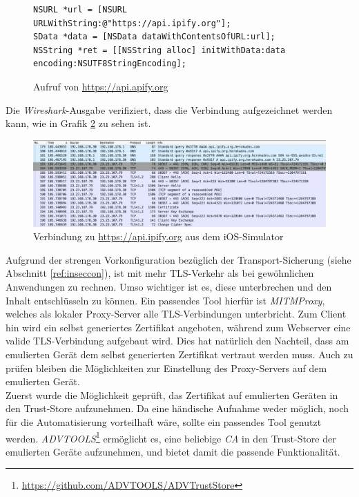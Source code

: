 \begin{figure}[htbp]
\begin{lstlisting}
NSURL *url = [NSURL URLWithString:@"https://api.ipify.org"];
SData *data = [NSData dataWithContentsOfURL:url];
NSString *ret = [[NSString alloc] initWithData:data encoding:NSUTF8StringEncoding];
\end{lstlisting}
\caption{Aufruf von \url{https://api.apify.org}}
\label{lis:WeitMobSFiOSOpenURLSec}
\end{figure}

Die \textit{Wireshark}-Ausgabe verifiziert, dass die Verbindung aufgezeichnet werden kann, wie in Grafik \ref{fig:WeitMobSFiOSWireshark} zu sehen ist.\\

\begin{figure}[htbp]
	\centering
	\includegraphics[width=\textwidth]{bilder/pentest_mobile_anwendungen/weiterentw_mobsf/wireshark_simulator.png}
	\caption{Verbindung zu \url{https://api.ipify.org} aus dem iOS-Simulator}
	\label{fig:WeitMobSFiOSWireshark}
\end{figure}

Aufgrund der strengen Vorkonfiguration bezüglich der Transport-Sicherung (siehe Abschnitt \ref{ref:inseccon}), ist mit mehr TLS-Verkehr als bei gewöhnlichen Anwendungen zu rechnen. Umso wichtiger ist es, diese unterbrechen und den Inhalt entschlüsseln zu können. Ein passendes Tool hierfür ist \textit{MITMProxy}, welches als lokaler Proxy-Server alle TLS-Verbindungen unterbricht. Zum Client hin wird ein selbst generiertes Zertifikat angeboten, während zum Webserver eine valide TLS-Verbindung aufgebaut wird. Dies hat natürlich den Nachteil, dass am emulierten Gerät dem selbst generierten Zertifikat vertraut werden muss. Auch zu prüfen bleiben die Möglichkeiten zur Einstellung des Proxy-Servers auf dem emulierten Gerät.\\

Zuerst wurde die Möglichkeit geprüft, das Zertifikat auf emulierten Geräten in den Trust-Store aufzunehmen. Da eine händische Aufnahme weder möglich, noch für die Automatisierung vorteilhaft wäre, sollte ein passendes Tool genutzt werden. \textit{ADVTOOLS}\footnote{\url{https://github.com/ADVTOOLS/ADVTrustStore}} ermöglicht es, eine beliebige \textit{CA} in den Trust-Store der emulierten Geräte aufzunehmen, und bietet damit die passende Funktionalität.\\

